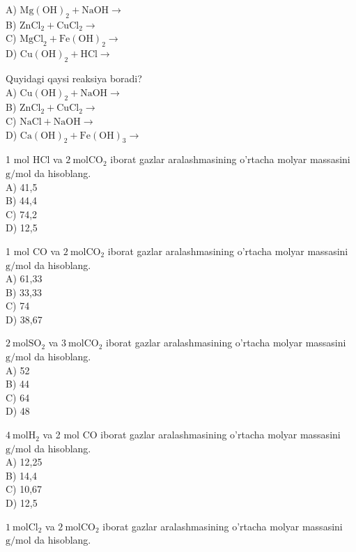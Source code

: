 A) $\mathrm{Mg}(\mathrm{OH})_{2}+\mathrm{NaOH} \rightarrow$\\
B) $\mathrm{ZnCl}_{2}+\mathrm{CuCl}_{2} \rightarrow$\\
C) $\mathrm{MgCl}_{2}+\mathrm{Fe}(\mathrm{OH})_{2} \rightarrow$\\
D) $\mathrm{Cu}(\mathrm{OH})_{2}+\mathrm{HCl} \rightarrow$
  \item Quyidagi qaysi reaksiya boradi?\\
A) $\mathrm{Cu}(\mathrm{OH})_{2}+\mathrm{NaOH} \rightarrow$\\
B) $\mathrm{ZnCl}_{2}+\mathrm{CuCl}_{2} \rightarrow$\\
C) $\mathrm{NaCl}+\mathrm{NaOH} \rightarrow$\\
D) $\mathrm{Ca}(\mathrm{OH})_{2}+\mathrm{Fe}(\mathrm{OH})_{3} \rightarrow$
  \item 1 mol HCl va $2 \mathrm{~mol} \mathrm{CO}_{2}$ iborat gazlar aralashmasining o'rtacha molyar massasini $\mathrm{g} / \mathrm{mol}$ da hisoblang.\\
A) 41,5\\
B) 44,4\\
C) 74,2\\
D) 12,5
  \item 1 mol CO va $2 \mathrm{~mol} \mathrm{CO}_{2}$ iborat gazlar aralashmasining o'rtacha molyar massasini $\mathrm{g} / \mathrm{mol}$ da hisoblang.\\
A) 61,33\\
B) 33,33\\
C) 74\\
D) 38,67
  \item $2 \mathrm{~mol} \mathrm{SO}_{2}$ va $3 \mathrm{~mol} \mathrm{CO}_{2}$ iborat gazlar aralashmasining o'rtacha molyar massasini $\mathrm{g} / \mathrm{mol}$ da hisoblang.\\
A) 52\\
B) 44\\
C) 64\\
D) 48
  \item $4 \mathrm{~mol} \mathrm{H}_{2}$ va 2 mol CO iborat gazlar aralashmasining o'rtacha molyar massasini $\mathrm{g} / \mathrm{mol}$ da hisoblang.\\
A) 12,25\\
B) 14,4\\
C) 10,67\\
D) 12,5
  \item $1 \mathrm{~mol} \mathrm{Cl}_{2}$ va $2 \mathrm{~mol} \mathrm{CO}_{2}$ iborat gazlar aralashmasining o'rtacha molyar massasini $\mathrm{g} / \mathrm{mol}$ da hisoblang.\\
